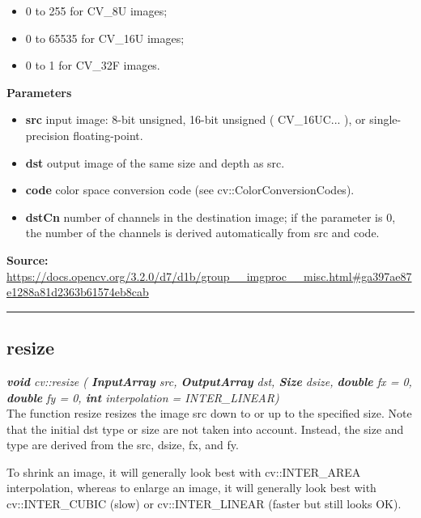 \begin{itemize}
    \item 0 to 255 for CV\_8U images;
    \item 0 to 65535 for CV\_16U images;
    \item 0 to 1 for CV\_32F images.
\end{itemize}

\textbf{Parameters}
\begin{itemize}
    \item \textbf{src} input image: 8-bit unsigned, 16-bit unsigned ( CV\_16UC... ), or single-precision floating-point.
    \item \textbf{dst} output image of the same size and depth as src.
    \item \textbf{code} color space conversion code (see cv::ColorConversionCodes).
    \item \textbf{dstCn} number of channels in the destination image; if the parameter is 0, the number of the channels is derived automatically from src and code.
\end{itemize}
   
\textbf{Source:} \url{https://docs.opencv.org/3.2.0/d7/d1b/group__imgproc__misc.html#ga397ae87e1288a81d2363b61574eb8cab}

\noindent\rule{\textwidth}{0.5pt}
		

\subsection*{resize}
\label{subsec:opencv_annex_used_functions_resize}

\textit{\textbf{void} cv::resize (
        \textbf{InputArray} src,
		\textbf{OutputArray}  	dst,
		\textbf{Size}  	dsize,
		\textbf{double}  	fx = 0,
		\textbf{double}  	fy = 0,
		\textbf{int}  	interpolation = INTER\_LINEAR)}\\
		
The function resize resizes the image src down to or up to the specified size. Note that the initial dst type or size are not taken into account. Instead, the size and type are derived from the src, dsize, fx, and fy.

To shrink an image, it will generally look best with cv::INTER\_AREA interpolation, whereas to enlarge an image, it will generally look best with cv::INTER\_CUBIC (slow) or cv::INTER\_LINEAR (faster but still looks OK).\\

